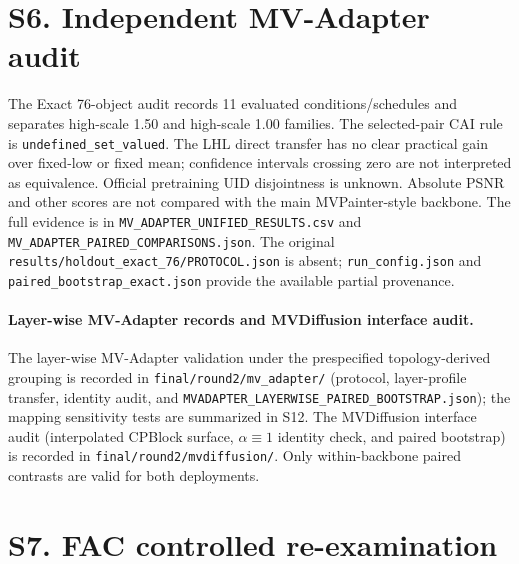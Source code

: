 \documentclass[10pt]{article}
\begin{document}
\section{S6. Independent MV-Adapter audit}

The Exact 76-object audit records 11 evaluated conditions/schedules and
separates high-scale 1.50 and high-scale 1.00 families. The selected-pair CAI rule is
\texttt{undefined\_set\_valued}. The LHL direct transfer has no clear
practical gain over fixed-low or fixed mean; confidence intervals crossing
zero are not interpreted as equivalence. Official pretraining UID
disjointness is unknown. Absolute PSNR and other scores are not compared with
the main MVPainter-style backbone. The full evidence is in
\texttt{MV\_ADAPTER\_UNIFIED\_RESULTS.csv} and
\texttt{MV\_ADAPTER\_PAIRED\_COMPARISONS.json}.
The original \texttt{results/holdout\_exact\_76/PROTOCOL.json} is absent;
\texttt{run\_config.json} and \texttt{paired\_bootstrap\_exact.json} provide
the available partial provenance.

\paragraph{Layer-wise MV-Adapter records and MVDiffusion interface audit.}
The layer-wise MV-Adapter validation under the prespecified topology-derived
grouping is recorded in
\texttt{final/round2/mv\_adapter/} (protocol, layer-profile transfer,
identity audit, and
\texttt{MVADAPTER\_LAYERWISE\_PAIRED\_BOOTSTRAP.json}); the mapping
sensitivity tests are summarized in S12. The MVDiffusion interface audit
(interpolated CPBlock surface, $\alpha\equiv 1$ identity check, and paired
bootstrap) is recorded in \texttt{final/round2/mvdiffusion/}. Only
within-backbone paired contrasts are valid for both deployments.

\section{S7. FAC controlled re-examination}
\end{document}
